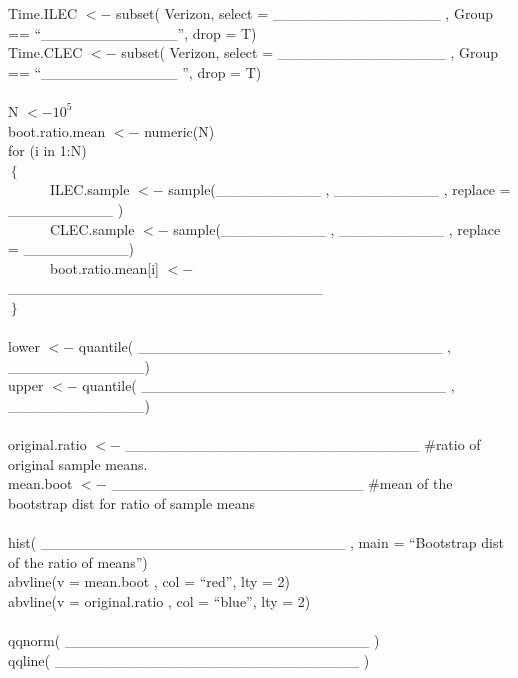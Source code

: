Time.ILEC $<-$ subset( Verizon, select = \_\_\_\_\_\_\_\_\_\_\_\_\_\_\_\_  , Group == ``\_\_\_\_\_\_\_\_\_\_\_\_\_'', drop = T)\\
Time.CLEC $<-$ subset( Verizon, select = \_\_\_\_\_\_\_\_\_\_\_\_\_\_\_\_  , Group == ``\_\_\_\_\_\_\_\_\_\_\_\_\_ '', drop = T)\\ 
\\
N $<- 10^5$\\
boot.ratio.mean $<-$ numeric(N)\\
for (i in 1:N)\\
$\left\{ \right.$\\
\indent \ \ \ \ \ \ ILEC.sample $<-$ sample(\_\_\_\_\_\_\_\_\_\_ , \_\_\_\_\_\_\_\_\_\_ , replace = \_\_\_\_\_\_\_\_\_\_ )\\
\indent \ \ \ \ \ \ CLEC.sample $<-$ sample(\_\_\_\_\_\_\_\_\_\_ , \_\_\_\_\_\_\_\_\_\_ , replace = \_\_\_\_\_\_\_\_\_\_)\\
\indent \ \ \ \ \ \ boot.ratio.mean[i] $<-$ \_\_\_\_\_\_\_\_\_\_\_\_\_\_\_\_\_\_\_\_\_\_\_\_\_\_\_\_\_\_  \\
$\left. \right\}$\\
\\
lower $<-$ quantile( \_\_\_\_\_\_\_\_\_\_\_\_\_\_\_\_\_\_\_\_\_\_\_\_\_\_\_\_\_  ,  \_\_\_\_\_\_\_\_\_\_\_\_\_) \\
upper $<-$ quantile( \_\_\_\_\_\_\_\_\_\_\_\_\_\_\_\_\_\_\_\_\_\_\_\_\_\_\_\_\_  ,  \_\_\_\_\_\_\_\_\_\_\_\_\_)\\
\\
original.ratio $<-$ \_\_\_\_\_\_\_\_\_\_\_\_\_\_\_\_\_\_\_\_\_\_\_\_\_\_\_\_  \#ratio of original sample means. \\
mean.boot $<-$  \_\_\_\_\_\_\_\_\_\_\_\_\_\_\_\_\_\_\_\_\_\_\_\_  \#mean of the bootstrap dist for ratio of sample means\\
\\
hist( \_\_\_\_\_\_\_\_\_\_\_\_\_\_\_\_\_\_\_\_\_\_\_\_\_\_\_\_\_  , main = ``Bootstrap dist of the ratio of means'')\\
abvline(v = mean.boot , col = ``red'', lty = 2) \\
abvline(v = original.ratio , col = ``blue'', lty = 2) \\
\\
qqnorm( \_\_\_\_\_\_\_\_\_\_\_\_\_\_\_\_\_\_\_\_\_\_\_\_\_\_\_\_\_ )\\
qqline( \_\_\_\_\_\_\_\_\_\_\_\_\_\_\_\_\_\_\_\_\_\_\_\_\_\_\_\_\_ )\\
\ee


\clearpage

